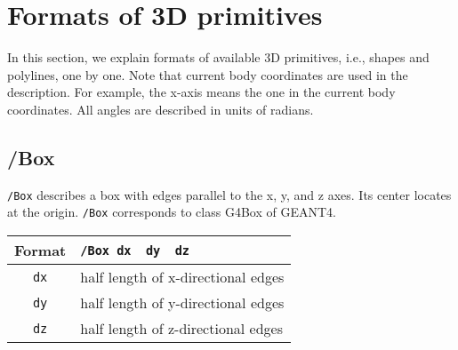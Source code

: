 \section{Formats of 3D primitives}  

In this section, we explain formats of available 3D primitives,  
i.e., shapes and polylines, one by one.
Note that current body coordinates are used in the description.
For example, the x-axis means the one in the current body coordinates.
All angles are described in units of radians.


\subsection{/Box}

\verb+/Box+ describes a box with edges parallel to the x, y, and z axes.
Its center locates at the origin.
\verb+/Box+ corresponds to class G4Box of GEANT4.
\vspace{.20in}

\begin{tabular}{|c|l|}
\hline%
Format & \verb+/Box dx  dy  dz+\\
\hline%
\verb+dx+     & half length of x-directional edges\\
\hline%
\verb+dy+     & half length of y-directional edges\\
\hline%
\verb+dz+     & half length of z-directional edges\\
\hline%
\end{tabular}



